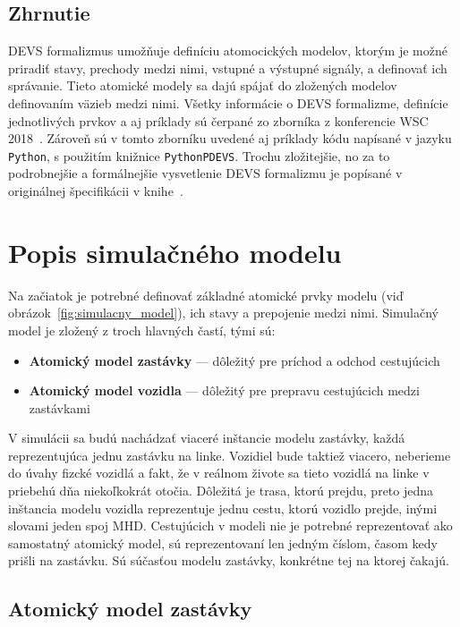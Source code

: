 \subsection*{Zhrnutie}
DEVS formalizmus umožňuje definíciu atomocických modelov, ktorým je možné priradiť stavy, prechody medzi nimi, vstupné a výstupné signály, a definovať ich správanie.
Tieto atomické modely sa dajú spájať do zložených modelov definovaním väzieb medzi nimi.
Všetky informácie o DEVS formalizme, definície jednotlivých prvkov a aj príklady sú čerpané zo zborníka z konferencie WSC 2018~\cite{tendeloo2018discrete}.
Zároveň sú v tomto zborníku uvedené aj príklady kódu napísané v jazyku \texttt{Python}, s použitím knižnice \texttt{PythonPDEVS}.
Trochu zložitejšie, no za to podrobnejšie a formálnejšie vysvetlenie DEVS formalizmu je popísané v originálnej špecifikácii v knihe~\cite{zeigler2000theory}.

\section{Popis simulačného modelu}
Na začiatok je potrebné definovať základné atomické prvky modelu (viď obrázok~\ref{fig:simulacny_model}), ich stavy a prepojenie medzi nimi.
Simulačný model je zložený z troch hlavných častí, tými sú:
\begin{itemize}
  \item \textbf{Atomický model zastávky} --- dôležitý pre príchod a odchod cestujúcich
  \item \textbf{Atomický model vozidla} --- dôležitý pre prepravu cestujúcich medzi zastávkami
\end{itemize}

V simulácii sa budú nachádzať viaceré inštancie modelu zastávky, každá reprezentujúca jednu zastávku na linke.
Vozidiel bude taktiež viacero, neberieme do úvahy fizcké vozidlá a fakt, že v reálnom živote sa tieto vozidlá na linke v priebehú dňa niekoľkokrát otočia.
Dôležitá je trasa, ktorú prejdu, preto jedna inštancia modelu vozidla reprezentuje jednu cestu, ktorú vozidlo prejde, inými slovami jeden spoj MHD.
Cestujúcich v modeli nie je potrebné reprezentovať ako samostatný atomický model, sú reprezentovaní len jedným číslom, časom kedy prišli na zastávku.
Sú súčasťou modelu zastávky, konkrétne tej na ktorej čakajú.

\newpage
\subsection*{Atomický model zastávky}\label{model_zastavky}

